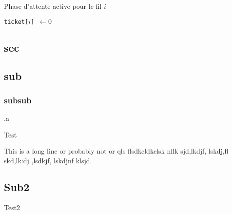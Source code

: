\documentclass[a4paper, 12pt, twoside]{article}
\begin{document}
    \vspace{12pt}
    
    \begin{indalgo}{Phase d'attente active pour le fil $i$}

        \BlankLine


        \texttt{ticket[$i$] $\gets 0$} \;
    \end{indalgo}

    \vspace{12pt}

    \begin{indt}{\section{sec}}
        \begin{indt}{\subsection{sub}}
            \begin{indt}{\subsubsection{subsub}}
                .a

                \begin{indalgo}{Test}
                    \caption{Test}


                    This is a long line or probably not or qls flsdkcldkclsk nflk sjd,lkdjf, lskdj,fl skd,lk:dj ,lsdkjf, lskdjnf klsjd.
                \end{indalgo}
            \end{indt}
        \end{indt}

        \vspace{12pt}
        
        \begin{indt}{\subsection{Sub2}}
            \begin{indalgo}{Test2}
            \end{indalgo}
        \end{indt}
    \end{indt}
    
\end{document}
